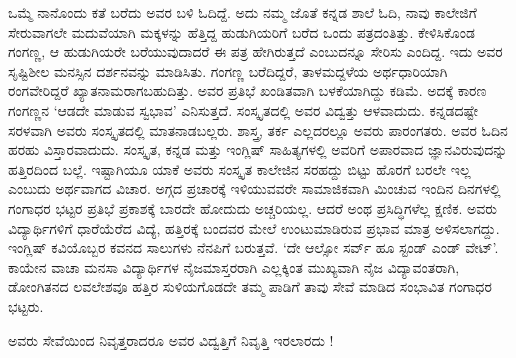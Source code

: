 {ಒಮ್ಮೆ ನಾನೊಂದು ಕತೆ ಬರೆದು ಅವರ ಬಳಿ ಓದಿದ್ದೆ. ಅದು ನಮ್ಮ ಜೊತೆ ಕನ್ನಡ ಶಾಲೆ ಓದಿ, ನಾವು ಕಾಲೇಜಿಗೆ ಸೇರುವಾಗಲೇ ಮದುವೆಯಾಗಿ ಮಕ್ಕಳನ್ನು ಹೆತ್ತಿದ್ದ ಹುಡುಗಿಯರಿಗೆ ಬರೆದ ಒಂದು ಪತ್ರದಂತಿತ್ತು. ಕೇಳಿಸಿಕೊಂಡ ಗಂಗಣ್ಣ, ಆ ಹುಡುಗಿಯರೇ  ಬರೆಯುವುದಾದರೆ ಈ ಪತ್ರ ಹೇಗಿರುತ್ತದೆ ಎಂಬುದನ್ನೂ ಸೇರಿಸು ಎಂದಿದ್ದ. ಇದು ಅವರ  ಸೃಷ್ಟಿಶೀಲ ಮನಸ್ಸಿನ ದರ್ಶನವನ್ನು ಮಾಡಿಸಿತು. ಗಂಗಣ್ಣ ಬರೆದಿದ್ದರೆ, ತಾಳಮದ್ದಳೆಯ ಅರ್ಥಧಾರಿಯಾಗಿ ರಂಗವೇರಿದ್ದರೆ ಖ್ಯಾತನಾಮರಾಗಬಹುದಿತ್ತು. ಅವರ ಪ್ರತಿಭೆ ಖಂಡಿತವಾಗಿ  ಬಳಕೆಯಾಗಿದ್ದು ಕಡಿಮೆ. ಅದಕ್ಕೆ ಕಾರಣ \hbox{ಗಂಗಣ್ಣನ} ‘ಆಡದೇ ಮಾಡುವ ಸ್ವಭಾವ’ ಎನಿಸುತ್ತದೆ. ಸಂಸ್ಕೃತದಲ್ಲಿ ಅವರ ವಿದ್ವತ್ತು ಆಳವಾದುದು. ಕನ್ನಡ\-ದಷ್ಟೇ ಸರಳವಾಗಿ ಅವರು ಸಂಸ್ಕೃತದಲ್ಲಿ ಮಾತನಾಡಬಲ್ಲರು. ಶಾಸ್ತ್ರ, ತರ್ಕ \hbox{ಎಲ್ಲದರಲ್ಲೂ} ಅವರು ಪಾರಂಗತರು. ಅವರ ಓದಿನ ಹರಹು ವಿಸ್ತಾರವಾದುದು. ಸಂಸ್ಕೃತ,  ಕನ್ನಡ ಮತ್ತು ಇಂಗ್ಲಿಷ್ ಸಾಹಿತ್ಯಗಳಲ್ಲಿ  ಅವರಿಗೆ ಅಪಾರವಾದ ಜ್ಞಾನವಿರುವುದನ್ನು ಹತ್ತಿರದಿಂದ ಬಲ್ಲೆ. ಇಷ್ಟಾಗಿಯೂ ಯಾಕೆ ಅವರು ಸಂಸ್ಕೃತ ಕಾಲೇಜಿನ ಸರಹದ್ದು ಬಿಟ್ಟು ಹೊರಗೆ ಬರಲೇ ಇಲ್ಲ ಎಂಬುದು ಅರ್ಥವಾಗದ ವಿಚಾರ. ಅಗ್ಗದ ಪ್ರಚಾರಕ್ಕೆ ಇಳಿಯುವವರೇ ಸಾಮಾಜಿಕ\-ವಾಗಿ ಮಿಂಚುವ ಇಂದಿನ ದಿನಗಳಲ್ಲಿ ಗಂಗಾಧರ ಭಟ್ಟರ ಪ್ರತಿಭೆ ಪ್ರಕಾಶಕ್ಕೆ ಬಾರದೇ ಹೋದುದು ಅಚ್ಚರಿಯಲ್ಲ. ಆದರೆ ಅಂಥ ಪ್ರಸಿದ್ಧಿಗಳೆಲ್ಲ ಕ್ಷಣಿಕ. ಅವರು ವಿದ್ಯಾರ್ಥಿಗಳಿಗೆ ಧಾರೆಯೆರೆದ ವಿದ್ಯೆ, ಹತ್ತಿರಕ್ಕೆ ಬಂದವರ ಮೇಲೆ ಉಂಟುಮಾಡಿರುವ ಪ್ರಭಾವ ಮಾತ್ರ ಅಳಿಸಲಾಗದ್ದು. ಇಂಗ್ಲಿಷ್ ಕವಿಯೊಬ್ಬರ ಕವನದ ಸಾಲುಗಳು ನೆನಪಿಗೆ ಬರುತ್ತವೆ. ‘ದೇ ಆಲ್ಸೋ ಸರ್ವ್ ಹೂ ಸ್ಟಂಡ್ ಎಂಡ್ ವೇಟ್’. 
ಕಾಯೇನ  ವಾಚಾ ಮನಸಾ ವಿದ್ಯಾರ್ಥಿಗಳ ನೈಜಮಾಸ್ತರರಾಗಿ ಎಲ್ಲಕ್ಕಿಂತ ಮುಖ್ಯವಾಗಿ ನೈಜ ವಿದ್ಯಾ\-ವಂತರಾಗಿ, ಡೋಂಗಿತನದ ಲವಲೇಶವೂ ಹತ್ತಿರ ಸುಳಿಯಗೊಡದೇ ತಮ್ಮ ಪಾಡಿಗೆ ತಾವು ಸೇವೆ ಮಾಡಿದ \hbox{ಸಂಭಾವಿತ} ಗಂಗಾಧರ ಭಟ್ಟರು. 

ಅವರು ಸೇವೆಯಿಂದ ನಿವೃತ್ತರಾದರೂ ಅವರ ವಿದ್ವತ್ತಿಗೆ  ನಿವೃತ್ತಿ ಇರಲಾರದು !

\articleend
}

